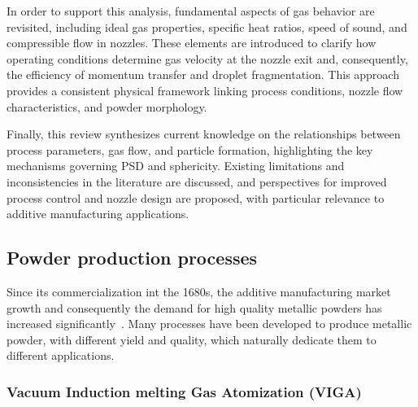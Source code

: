 \documentclass[../main]{subfiles}
\begin{document}
In order to support this analysis, fundamental aspects of gas behavior are revisited, including ideal gas properties, specific heat ratios, speed of sound, and compressible flow in nozzles. These elements are introduced to clarify how operating conditions determine gas velocity at the nozzle exit and, consequently, the efficiency of momentum transfer and droplet fragmentation. This approach provides a consistent physical framework linking process conditions, nozzle flow characteristics, and powder morphology.

Finally, this review synthesizes current knowledge on the relationships between process parameters, gas flow, and particle formation, highlighting the key mechanisms governing PSD and sphericity. Existing limitations and inconsistencies in the literature are discussed, and perspectives for improved process control and nozzle design are proposed, with particular relevance to additive manufacturing applications.




\subsection{Powder production processes}

Since its commercialization int the 1680s, the additive manufacturing market growth and consequently the demand for high quality metallic powders has increased significantly~\cite{Feng2024PreparationAdditive}. Many processes have been developed to produce metallic powder, with different yield and quality, which naturally dedicate them to different applications.



\subsubsection{Vacuum Induction melting Gas Atomization (VIGA)}
\end{document}

